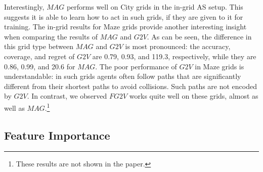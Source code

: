 \documentclass[letterpaper]{article} %
\newcommand{\gtv}[1]{\ensuremath{\textit{G2V}}\xspace}
\newcommand{\fgtv}[1]{\ensuremath{\textit{FG2V}}\xspace}
\newcommand{\mapfgas}[1]{\ensuremath{\textit{MAG}}\xspace}
\begin{document}
Interestingly, \mapfgas\ performs well on City grids in the in-grid AS setup. This suggests it is able to learn how to act in such grids, if they are given to it for training. 
The in-grid results for Maze grids provide another interesting insight when comparing the results of \mapfgas\ and \gtv\ . As can be seen, the difference in this grid type between \mapfgas\ and \gtv\ is most pronounced: the accuracy, coverage, and regret of \gtv\ are 0.79, 0.93, and 119.3, respectively, while they are 0.86, 0.99, and 20.6 for \mapfgas\ .  
The poor performance of \gtv\ in Maze grids is understandable: in such grids agents often follow paths that are significantly different from their shortest paths to avoid collisions. Such paths are not encoded by \gtv\ . In contrast, we observed   \fgtv\ works quite well on these grids, almost as well as \mapfgas\ .\footnote{These results are not shown in the paper.} 




\subsection{Feature Importance}
\end{document}
